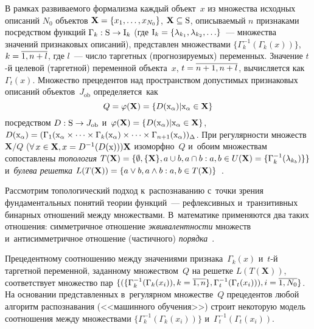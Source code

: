 \begin{multicols}{2}
     В рамках развиваемого формализма каждый объект~$x$ из множества 
исходных описаний $N_0$ объектов $\mathbf{X}\hm= \{x_1, \ldots , 
x_{N_0}\}$, $\mathbf{X}\hm\subseteq \mathrm{S}$, опи\-сы\-ва\-емый $n$ 
признаками посредством функций $\Gamma_k: \mathrm{S}\hm\to \mathrm{I}_k$ 
(где $\mathrm{I}_k\hm= \{ \lambda_{k_1}, \lambda_{k_2}, \ldots\}$~--- 
множества значений признаковых описаний), представлен множествами 
     $\{ \Gamma_k^{-1}(\Gamma_k(x))\}$, $k\hm=\overline{1, n+l}$, где $l$~--- 
число таргетных (прогнозируемых) переменных. Значение $t$-й целевой 
(таргетной) переменной объекта~$x$, $t\hm = \overline{n+1, n+l}$, 
вычисляется как~$\Gamma_t(x)$. Множество прецедентов над пространством 
допустимых признаковых описаний объектов~$J_{\mathrm{ob}}$ 
опре\-де\-ля\-ет\-ся~как 
$$
Q=\varphi(\mathbf{X})\hm=\{ D(\mathrm{x}_\alpha)\vert 
\mathrm{x}_\alpha \hm\in \mathbf{X}\}
$$ 
посредством $D:\mathrm{S}\hm\to 
J_{\mathrm{ob}}$ и~$\varphi(\mathbf{X})\hm= \{ D(\mathrm{x}_\alpha ) \vert 
\mathrm{x}_\alpha\hm\in \mathbf{X}\}$, $D(\mathrm{x}_\alpha) \hm= 
(\Gamma_1(\mathrm{x}_\alpha \times \cdots\times \Gamma_k(\mathrm{x}_\alpha) 
\times\cdots\times \Gamma_{n+1}(\mathrm{x}_\alpha))_\Delta$. При 
регулярности множеств $\mathbf{X}/Q$ ($\forall\,x\hm\in \mathbf{X}, 
x\hm= {D}^{-1}({D}(\mathrm{x})))\mathbf{X}$ изоморфно~$Q$ 
и~обоим множествам сопоставлены \textit{топология} $T(\mathbf{X})\hm= 
\{\emptyset, \{\mathbf{X}\}, a\hm\cup b, a\hm\cap b: a,b\hm\in U(\mathbf{X})\hm= 
\{\Gamma_k^{-1}(\lambda_{k_b})\}\}$ и~\textit{булева решетка} 
$L(T(\mathbf{X}))\hm= \{a\vee b, a\wedge b: a,b\hm\in  
T(\mathbf{X})\}$~\cite{5-tr}.
     
     Рассмотрим топологический подход к~распознаванию с~точки зрения 
фундаментальных понятий теории функций~--- рефлексивных и~транзитивных 
бинарных отношений между множествами. В~математике применяются два 
таких отношения: симметричное отношение \textit{эквивалентности} множеств 
и~антисимметричное отношение (частичного) \textit{порядка}~\cite{6-tr}. 
     
     Прецедентному соотношению между значениями 
признака~$\Gamma_k(x)$ и~$t$-й таргетной переменной, заданному 
множеством~$Q$ на решетке $L(T(\mathbf{X}))$, соответствует множество пар 
$\{ ( \{ \Gamma_k^{-1}(\Gamma_k(x_i)), k\hm=\overline{1,  n}\},  
\Gamma_t^{-1}(\Gamma_t(x_i))), i\hm= \overline{1, N_0}\}$. На основании 
представленных в~регулярном множестве~$Q$ прецедентов любой алгоритм 
распознавания (<<машинного обучения>>) строит некоторую модель 
соотношения между множествами $\{ \Gamma_k^{-1}(\Gamma_k(x_i))\}$  
и~$\Gamma_t^{-1}(\Gamma_t(x_i))$.
     

\end{multicols}
